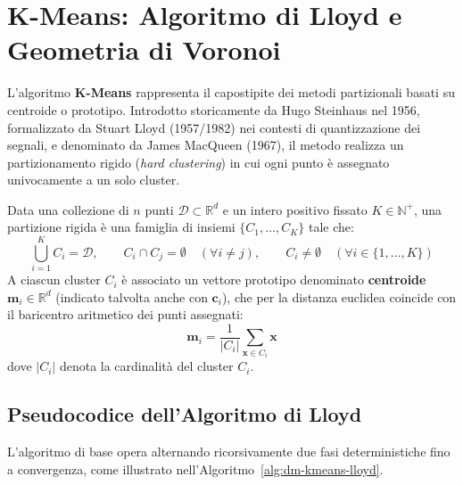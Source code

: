 \section{K-Means: Algoritmo di Lloyd e Geometria di Voronoi}
\label{sec:dm-kmeans-algorithm-geometry}

L'algoritmo \textbf{K-Means} rappresenta il capostipite dei metodi partizionali basati su centroide o prototipo. Introdotto storicamente da Hugo Steinhaus nel 1956, formalizzato da Stuart Lloyd (1957/1982) nei contesti di quantizzazione dei segnali, e denominato da James MacQueen (1967), il metodo realizza un partizionamento rigido (\textit{hard clustering}) in cui ogni punto è assegnato univocamente a un solo cluster.

\begin{definition}
Data una collezione di $n$ punti $\mathcal{D} \subset \mathbb{R}^d$ e un intero positivo fissato $K \in \mathbb{N}^+$, una partizione rigida è una famiglia di insiemi $\{C_1, \dots, C_K\}$ tale che:
\begin{equation}
    \bigcup_{i=1}^K C_i = \mathcal{D}, \qquad C_i \cap C_j = \emptyset \quad (\forall i \ne j), \qquad C_i \ne \emptyset \quad (\forall i \in \{1, \dots, K\})
\end{equation}
A ciascun cluster $C_i$ è associato un vettore prototipo denominato \textbf{centroide} $\mathbf{m}_i \in \mathbb{R}^d$ (indicato talvolta anche con $\mathbf{c}_i$), che per la distanza euclidea coincide con il baricentro aritmetico dei punti assegnati:
\begin{equation}
    \mathbf{m}_i = \frac{1}{|C_i|} \sum_{\mathbf{x} \in C_i} \mathbf{x}
    \label{eq:dm-centroid-definition}
\end{equation}
dove $|C_i|$ denota la cardinalità del cluster $C_i$.
\end{definition}

\subsection{Pseudocodice dell'Algoritmo di Lloyd}

L'algoritmo di base opera alternando ricorsivamente due fasi deterministiche fino a convergenza, come illustrato nell'Algoritmo~\ref{alg:dm-kmeans-lloyd}.

